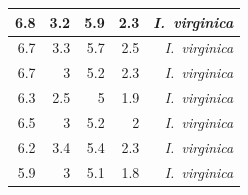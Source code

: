\begin{enumerate}
\begin{center}
\begin{longtable}{|r|r|r|r|r|}
				\hline
				6.8   & 3.2   & 5.9   & 2.3   & \textit{I. virginica} \\
				\hline
				6.7   & 3.3   & 5.7   & 2.5   & \textit{I. virginica} \\
				\hline
				6.7   & 3     & 5.2   & 2.3   & \textit{I. virginica} \\
				\hline
				6.3   & 2.5   & 5     & 1.9   & \textit{I. virginica} \\
				\hline
				6.5   & 3     & 5.2   & 2     & \textit{I. virginica} \\
				\hline
				6.2   & 3.4   & 5.4   & 2.3   & \textit{I. virginica} \\
				\hline
				5.9   & 3     & 5.1   & 1.8   & \textit{I. virginica} \\
				\hline
			\end{longtable}%
		\end{center}%
	\end{enumerate}